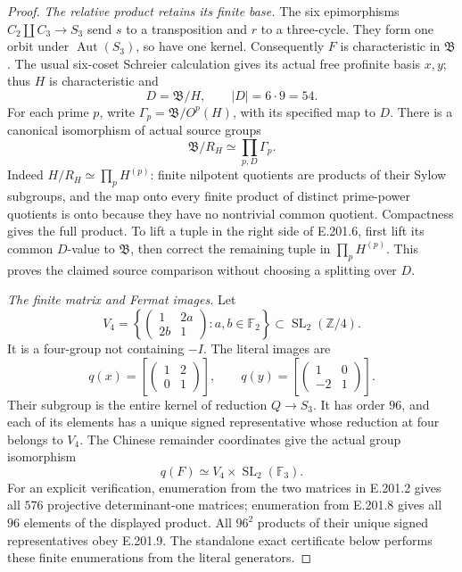 \begin{proof}
\emph{The relative product retains its finite base.}
The six epimorphisms \(C_2\amalg C_3\to S_3\) send \(s\)
to a transposition and \(r\) to a three-cycle.  They form one
orbit under \(\operatorname{Aut}(S_3)\), so have one kernel.
Consequently \(F\) is characteristic in \(\mathfrak B\).
The usual six-coset Schreier calculation gives its actual free
profinite basis \(x,y\); thus \(H\) is characteristic and
\[
                 D=\mathfrak B/H,\qquad |D|=6\cdot9=54.
\tag{E.201.5}
\]
For each prime \(p\), write
\(\Gamma_p=\mathfrak B/O^p(H)\), with its specified map to
\(D\).  There is a canonical isomorphism of actual source groups
\[
             \mathfrak B/R_H\simeq\prod_{p,D}\Gamma_p.
\tag{E.201.6}
\]
Indeed \(H/R_H\simeq\prod_pH^{(p)}\): finite nilpotent
quotients are products of their Sylow subgroups, and the map
onto every finite product of distinct prime-power quotients
is onto because they have no nontrivial common quotient.
Compactness gives the full product.  To lift a tuple in the
right side of E.201.6, first lift its common \(D\)-value to
\(\mathfrak B\), then correct the remaining tuple in
\(\prod_pH^{(p)}\).  This proves the claimed source comparison
without choosing a splitting over \(D\).

\emph{The finite matrix and Fermat images.}
Let
\[
 V_4=\left\{
           \begin{pmatrix}1&2a\\2b&1\end{pmatrix}
                  :a,b\in\mathbb F_2\right\}
          \subset\operatorname{SL}_2(\mathbb Z/4).
\tag{E.201.7}
\]
It is a four-group not containing \(-I\).  The literal images are
\[
 q(x)=\left[\begin{pmatrix}1&2\\0&1\end{pmatrix}\right],
 \qquad
 q(y)=\left[\begin{pmatrix}1&0\\-2&1\end{pmatrix}\right].
\tag{E.201.8}
\]
Their subgroup is the entire kernel of reduction \(Q\to S_3\).
It has order \(96\), and each of its elements has a unique
signed representative whose reduction at four belongs to \(V_4\).
The Chinese remainder coordinates give the actual group isomorphism
\[
               q(F)\simeq V_4\times\operatorname{SL}_2(\mathbb F_3).
\tag{E.201.9}
\]
For an explicit verification, enumeration from the two matrices in
E.201.2 gives all \(576\) projective determinant-one matrices;
enumeration from E.201.8 gives all \(96\) elements of the
displayed product.  All \(96^2\) products of their unique signed
representatives obey E.201.9.  The standalone exact certificate
below performs these finite enumerations from the literal generators.


\end{proof}

